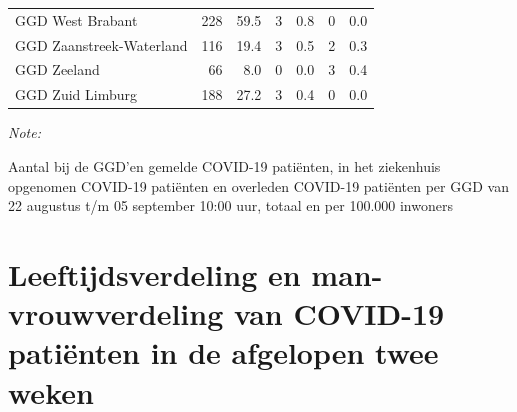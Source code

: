 \documentclass[
  english,
  man,floatsintext]{apa6}
\begin{document}
\begin{table}[H]
\begin{threeparttable}
\begin{tabular}{lrrrrrr}
GGD West Brabant & 228 & 59.5 & 3 & 0.8 & 0 & 0.0\\
GGD Zaanstreek-Waterland & 116 & 19.4 & 3 & 0.5 & 2 & 0.3\\
GGD Zeeland & 66 & 8.0 & 0 & 0.0 & 3 & 0.4\\
GGD Zuid Limburg & 188 & 27.2 & 3 & 0.4 & 0 & 0.0\\
\bottomrule
\end{tabular}
\begin{tablenotes}
\item \textit{Note: } 
\item Aantal bij de GGD’en gemelde COVID-19 patiënten, in het ziekenhuis opgenomen COVID-19 patiënten en overleden COVID-19 patiënten per GGD van 22 augustus t/m 05 september 10:00 uur, totaal en per 100.000 inwoners
\end{tablenotes}
\end{threeparttable}
\endgroup{}
\end{table}

\newpage

\hypertarget{leeftijdsverdeling-en-man-vrouwverdeling-van-covid-19-patiuxebnten-in-de-afgelopen-twee-weken}{%
\section{Leeftijdsverdeling en man-vrouwverdeling van COVID-19 patiënten in de afgelopen twee weken}\label{leeftijdsverdeling-en-man-vrouwverdeling-van-covid-19-patiuxebnten-in-de-afgelopen-twee-weken}}
\end{document}
